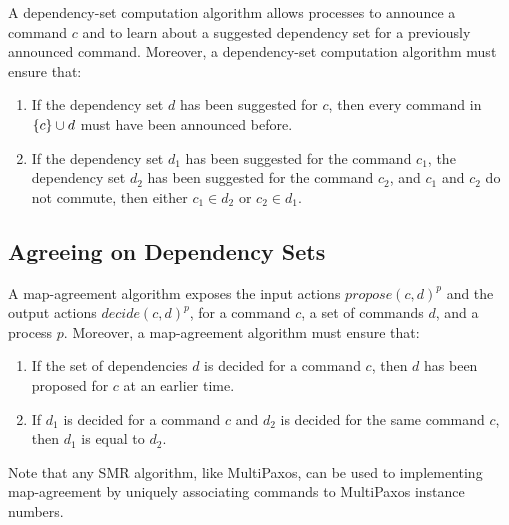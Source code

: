 
A dependency-set computation algorithm allows processes to announce a command $c$ and to learn about a suggested dependency set for a previously announced command.
Moreover, a dependency-set computation algorithm must ensure that:
\begin{enumerate}
    \item If the dependency set $d$ has been suggested for $c$, then every command in $\left\{c\right\}\cup d$ must have been announced before.
    \item If the dependency set $d_1$ has been suggested for the command $c_1$, the dependency set $d_2$ has been suggested for the command $c_2$, and $c_1$ and $c_2$ do not commute, then either $c_1\in d_2$ or $c_2 \in d_1$.
\end{enumerate}

\subsection{Agreeing on Dependency Sets}

A map-agreement algorithm exposes the input actions ${propose\left( c, d \right)}^p$ and the output actions ${decide\left( c, d \right)}^p$, for a command $c$, a set of commands $d$, and a process $p$.
Moreover, a map-agreement algorithm must ensure that: 
\begin{enumerate}
    \item If the set of dependencies $d$ is decided for a command $c$, then $d$ has been proposed for $c$ at an earlier time.
    \item If $d_1$ is decided for a command $c$ and $d_2$ is decided for the same command $c$, then $d_1$ is equal to $d_2$.
\end{enumerate}
Note that any SMR algorithm, like MultiPaxos, can be used to implementing map-agreement by uniquely associating commands to MultiPaxos instance numbers.

\printbibliography%


